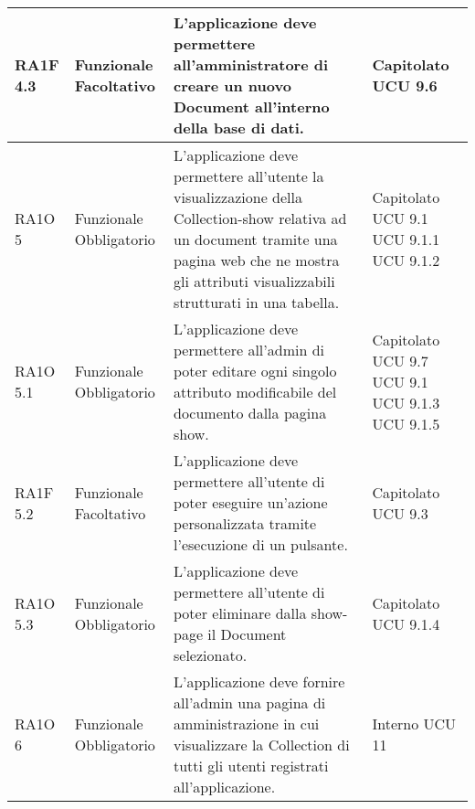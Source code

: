 \begin{center}
\begin{longtable}{ | l | p{2cm} | p{5cm} | p{1.7cm} |}
        RA1F 4.3 & Funzionale \newline  Facoltativo  & L’applicazione deve permettere all’amministratore di creare un nuovo Document all’interno della base di dati. &  Capitolato \newline  UCU 9.6 \newline  \\ \hline      
           
        RA1O 5 & Funzionale \newline  Obbligatorio  & L'applicazione deve permettere all'utente la visualizzazione della Collection-show relativa ad un document tramite una pagina web che ne mostra gli attributi visualizzabili strutturati in una tabella. &  Capitolato \newline  UCU 9.1 \newline  UCU 9.1.1 \newline  UCU 9.1.2 \newline  \\ \hline      
        RA1O 5.1 & Funzionale \newline  Obbligatorio  & L'applicazione deve permettere all'admin di poter editare ogni singolo attributo modificabile del documento dalla pagina show. &  Capitolato \newline  UCU 9.7 \newline  UCU 9.1 \newline  UCU 9.1.3 \newline  UCU 9.1.5 \newline  \\ \hline      
        RA1F 5.2 & Funzionale \newline  Facoltativo  & L’applicazione deve permettere all’utente di poter eseguire un’azione personalizzata tramite l’esecuzione di un pulsante. &  Capitolato \newline  UCU 9.3 \newline  \\ \hline      
        RA1O 5.3 & Funzionale \newline  Obbligatorio  & L'applicazione deve permettere all'utente di poter eliminare dalla show-page il Document selezionato.
 &  Capitolato \newline  UCU 9.1.4 \newline  \\ \hline      
        RA1O 6 & Funzionale \newline  Obbligatorio  & L'applicazione deve fornire all'admin una pagina di amministrazione in cui visualizzare la Collection di tutti gli utenti registrati all'applicazione. &  Interno \newline  UCU 11 \newline  \\ \hline      

\end{longtable}
\end{center}
